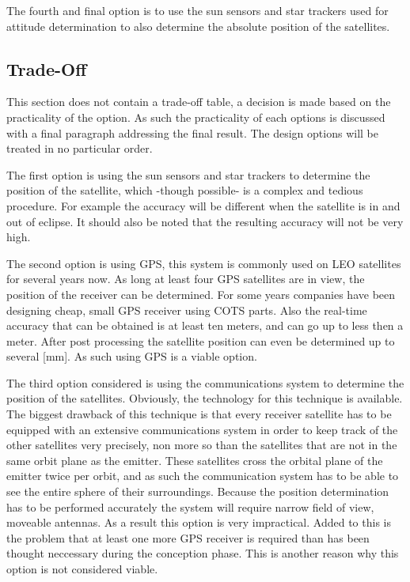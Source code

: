 The fourth and final option is to use the sun sensors and star trackers used for attitude determination to also determine the absolute position of the satellites.

\subsection{Trade-Off}
\label{navi2}
This section does not contain a trade-off table, a decision is made based on the practicality of the option. As such the practicality of each options is discussed with a final paragraph addressing the final result. The design options will be treated in no particular order.

The first option is using the sun sensors and star trackers to determine the position of the satellite, which -though possible- is a complex and tedious procedure. For example the accuracy will be different when the satellite is in and out of eclipse. It should also be noted that the resulting accuracy will not be very high.

The second option is using \acs{GPS}, this system is commonly used on \acs{LEO} satellites for several years now. As long at least four \acs{GPS} satellites are in view, the position of the receiver can be determined. For some years companies have been designing cheap, small GPS receiver using \acs{COTS} parts. Also the real-time accuracy that can be obtained is at least ten meters, and can go up to less then a meter. After post processing the satellite position can even be determined up to several [mm]. As such using \acs{GPS} is a viable option.

The third option considered is using the communications system to determine the position of the satellites. Obviously, the technology for this technique is available. The biggest drawback of this technique is that every receiver satellite has to be equipped with an extensive communications system in order to keep track of the other satellites very precisely, non more so than the satellites that are not in the same orbit plane as the emitter. These satellites cross the orbital plane of the emitter twice per orbit, and as such the communication system has to be able to see the entire sphere of their surroundings. Because the position determination has to be performed accurately the system will require narrow field of view, moveable antennas. As a result this option is very impractical. Added to this is the problem that at least one more \acs{GPS} receiver is required than has been thought neccessary during the conception phase. This is another reason why this option is not considered viable.

